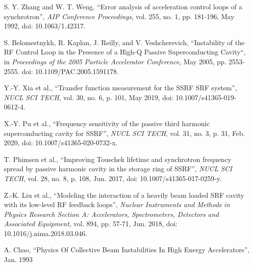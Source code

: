 \documentclass[letterpaper,
               nospread,     %
               ]{jacow}
\begin{document}
{\begin{thebibliography}{99}
      S. Y. Zhang and W. T. Weng, “Error analysis of acceleration control loops of a synchrotron”,
      \textit{AIP Conference Proceedings},
      vol. 255, no. 1, pp. 181-196, May 1992, doi: 10.1063/1.42317.

      S. Belomestnykh, R. Kaplan, J. Reilly, and V. Veshcherevich, “Instability of the RF Control Loop in the Presence of a High-Q Passive Superconducting Cavity“, in
      \textit{Proceedings of the 2005 Particle Accelerator Conference},
      May 2005, pp. 2553-2555. doi: 10.1109/PAC.2005.1591178.

      Y.-Y. Xia et al., “Transfer function measurement for the SSRF SRF system”,
      \textit{NUCL SCI TECH},
      vol. 30, no. 6, p. 101, May 2019, doi: 10.1007/s41365-019-0612-4.

      X.-Y. Pu et al., “Frequency sensitivity of the passive third harmonic superconducting cavity for SSRF”,
      \textit{NUCL SCI TECH},
      vol. 31, no. 3, p. 31, Feb. 2020, doi: 10.1007/s41365-020-0732-x.

      T. Phimsen et al., “Improving Touschek lifetime and synchrotron frequency spread by passive harmonic cavity in the storage ring of SSRF”,
      \textit{NUCL SCI TECH},
      vol. 28, no. 8, p. 108, Jun. 2017, doi: 10.1007/s41365-017-0259-y.

      Z.-K. Liu et al., “Modeling the interaction of a heavily beam loaded SRF cavity with its low-level RF feedback loops”,
      \textit{Nuclear Instruments and Methods in Physics Research Section A: Accelerators, Spectrometers, Detectors and Associated Equipment},
      vol. 894, pp. 57-71, Jun. 2018, doi: 10.1016/j.nima.2018.03.046.

      A. Chao, “Physics Of Collective Beam Instabilities In High Energy Accelerators”, Jan. 1993

   \end{thebibliography}
} %
%
% 

\end{document}
